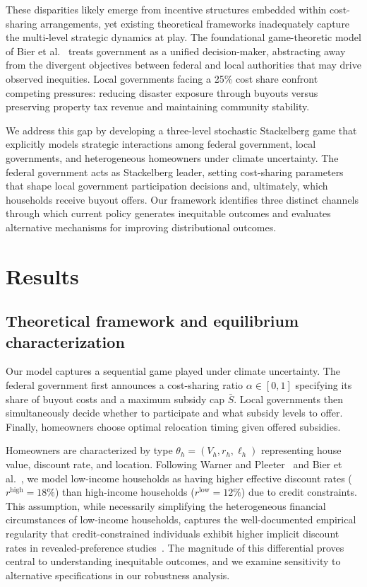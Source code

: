 \documentclass[11pt,letterpaper]{article}
\theoremstyle{definition}
\begin{document}
These disparities likely emerge from incentive structures embedded within cost-sharing arrangements, yet existing theoretical frameworks inadequately capture the multi-level strategic dynamics at play. The foundational game-theoretic model of Bier et al.~\cite{bier2019game} treats government as a unified decision-maker, abstracting away from the divergent objectives between federal and local authorities that may drive observed inequities. Local governments facing a 25\% cost share confront competing pressures: reducing disaster exposure through buyouts versus preserving property tax revenue and maintaining community stability.

We address this gap by developing a three-level stochastic Stackelberg game that explicitly models strategic interactions among federal government, local governments, and heterogeneous homeowners under climate uncertainty. The federal government acts as Stackelberg leader, setting cost-sharing parameters that shape local government participation decisions and, ultimately, which households receive buyout offers. Our framework identifies three distinct channels through which current policy generates inequitable outcomes and evaluates alternative mechanisms for improving distributional outcomes.

\section*{Results}

\subsection*{Theoretical framework and equilibrium characterization}

Our model captures a sequential game played under climate uncertainty. The federal government first announces a cost-sharing ratio $\alpha \in [0,1]$ specifying its share of buyout costs and a maximum subsidy cap $\bar{S}$. Local governments then simultaneously decide whether to participate and what subsidy levels to offer. Finally, homeowners choose optimal relocation timing given offered subsidies.

Homeowners are characterized by type $\theta_h = (V_h, r_h, \ell_h)$ representing house value, discount rate, and location. Following Warner and Pleeter~\cite{warner2001personal} and Bier et al.~\cite{bier2019game}, we model low-income households as having higher effective discount rates ($r^{\text{high}} = 18\%$) than high-income households ($r^{\text{low}} = 12\%$) due to credit constraints. This assumption, while necessarily simplifying the heterogeneous financial circumstances of low-income households, captures the well-documented empirical regularity that credit-constrained individuals exhibit higher implicit discount rates in revealed-preference studies~\cite{hausman1979individual, frederick2002time}. The magnitude of this differential proves central to understanding inequitable outcomes, and we examine sensitivity to alternative specifications in our robustness analysis.
\end{document}
